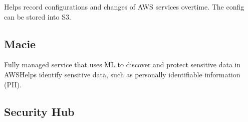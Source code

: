 Helps record configurations and changes of AWS services overtime.
The config can be stored into S3.

\subsection{Macie}\label{subsec:macie}

Fully managed service that uses ML to discover and protect sensitive data in AWS\.
Helps identify sensitive data, such as personally identifiable information (PII).

\subsection{Security Hub}\label{subsec:security-hub}
